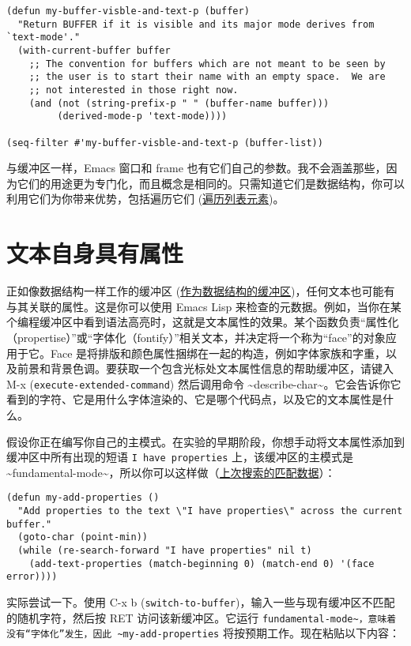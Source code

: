 \documentclass[11pt]{ctexart}
\begin{document}
\begin{verbatim}
(defun my-buffer-visble-and-text-p (buffer)
  "Return BUFFER if it is visible and its major mode derives from `text-mode'."
  (with-current-buffer buffer
    ;; The convention for buffers which are not meant to be seen by
    ;; the user is to start their name with an empty space.  We are
    ;; not interested in those right now.
    (and (not (string-prefix-p " " (buffer-name buffer)))
         (derived-mode-p 'text-mode))))

(seq-filter #'my-buffer-visble-and-text-p (buffer-list))
\end{verbatim}

与缓冲区一样，Emacs 窗口和 frame 也有它们自己的参数。我不会涵盖那些，因为它们的用途更为专门化，而且概念是相同的。只需知道它们是数据结构，你可以利用它们为你带来优势，包括遍历它们 (\hyperref[sec:org94bd4fd]{遍历列表元素})。
\section{文本自身具有属性}
\label{sec:orgea51fad}
正如像数据结构一样工作的缓冲区 (\hyperref[sec:orgc0d6740]{作为数据结构的缓冲区})，任何文本也可能有与其关联的属性。这是你可以使用 Emacs Lisp 来检查的元数据。例如，当你在某个编程缓冲区中看到语法高亮时，这就是文本属性的效果。某个函数负责“属性化（propertise）”或“字体化（fontify）”相关文本，并决定将一个称为“face”的对象应用于它。Face 是将排版和颜色属性捆绑在一起的构造，例如字体家族和字重，以及前景和背景色调。要获取一个包含光标处文本属性信息的帮助缓冲区，请键入 M-x (\texttt{execute-extended-command}) 然后调用命令 \textasciitilde{}describe-char\textasciitilde{}。它会告诉你它看到的字符、它是用什么字体渲染的、它是哪个代码点，以及它的文本属性是什么。

假设你正在编写你自己的主模式。在实验的早期阶段，你想手动将文本属性添加到缓冲区中所有出现的短语 \texttt{I have properties} 上，该缓冲区的主模式是 \textasciitilde{}fundamental-mode\textasciitilde{}，所以你可以这样做（\hyperref[sec:org5d051bd]{上次搜索的匹配数据}）：

\begin{verbatim}
(defun my-add-properties ()
  "Add properties to the text \"I have properties\" across the current buffer."
  (goto-char (point-min))
  (while (re-search-forward "I have properties" nil t)
    (add-text-properties (match-beginning 0) (match-end 0) '(face error))))
\end{verbatim}

实际尝试一下。使用 C-x b (\texttt{switch-to-buffer})，输入一些与现有缓冲区不匹配的随机字符，然后按 RET 访问该新缓冲区。它运行 \texttt{fundamental-mode\textasciitilde{}，意味着没有“字体化”发生，因此 \textasciitilde{}my-add-properties} 将按预期工作。现在粘贴以下内容：
\end{document}
